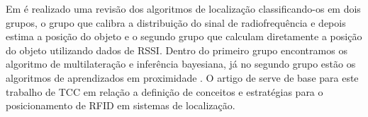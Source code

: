 Em  é realizado uma revisão dos algoritmos de localização classificando-os em dois grupos, 
o grupo que calibra a distribuição do sinal de radiofrequência e depois estima a posição do objeto e o segundo grupo que 
calculam diretamente a posição do objeto utilizando dados de RSSI. Dentro do primeiro grupo encontramos os algoritmo de 
multilateração e inferência bayesiana, já no segundo grupo estão os algoritmos de aprendizados em proximidade \cite{rfid2009review}.
%
O artigo de  serve de base para este trabalho de TCC em relação a definição de conceitos e estratégias para o 
posicionamento de RFID em sistemas de localização.
